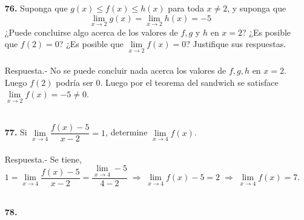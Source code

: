 \begin{enumerate}
\item [\Large\bfseries 76.]Suponga que $g(x) \leq f(x) \leq h(x)$ para toda $x \neq 2$, y suponga que
    $$\lim_{x\to 2} g(x) = \lim_{x\to 2}h(x)=-5$$
¿Puede concluirse algo acerca de los valores de $f, g$ y $h$ en $x = 2$? ¿Es posible que $f(2) = 0$? ¿Es posible que $\lim\limits_{x\to 2} f(x) = 0$? Justifique sus respuestas.\\\\
    Respuesta.-\; No se puede concluir nada acerca los valores de $f,g,h$ en $x=2$. Luego $f(2)$ podría ser $0$. Luego por el teorema del sandwich se satisface $\lim\limits_{x\to 2}f(x)=-5 \neq 0$.\\\\

\item [\Large\bfseries 77.] Si $\lim\limits_{x\to 4} \dfrac{f(x)-5}{x-2}=1$, determine $\lim\limits_{x\to 4}f(x)$.\\\\
    Respuesta.-\; Se tiene, $$1=\lim\limits_{x\to 4}\dfrac{f(x)-5}{x-2}=\dfrac{\lim\limits_{x\to 4}-5}{4-2} \; \Longrightarrow \; \lim\limits_{x\to 4} f(x)-5=2 \; \Longrightarrow \; \lim\limits_{x\to 4}f(x)=7.$$\\

\item [\Large\bfseries 78.]

\end{enumerate}
